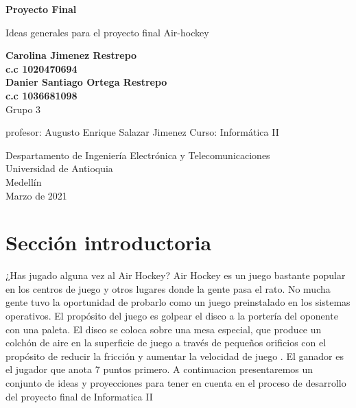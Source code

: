 \documentclass{article}
\begin{document}
\begin{titlepage}
    \begin{center}
        \vspace*{1cm}
            
        \Huge
        \textbf{Proyecto Final}
            
        \vspace{0.5cm}
        \LARGE
        Ideas generales para el proyecto final Air-hockey 
            
        \vspace{1.5cm}
            
        \textbf{Carolina Jimenez Restrepo}\\
        \textbf   { c.c 1020470694}\\
        \textbf{Danier Santiago Ortega Restrepo}\\
        \textbf{c.c 1036681098 }
          \\  Grupo 3
            
            \vspace{2.9cm}
         
                   profesor: Augusto Enrique Salazar Jimenez
                   Curso: Informática II
        \vfill
            
        \vspace{0.8cm}
            
        \Large
        Despartamento de Ingeniería Electrónica y Telecomunicaciones\\
        Universidad de Antioquia\\
        Medellín\\
        Marzo de 2021
            
    \end{center}
\end{titlepage}

\tableofcontents
\newpage
\section{Sección introductoria}\label{intro}
¿Has jugado alguna vez al Air Hockey? Air Hockey es un juego bastante popular en los centros de juego y otros lugares donde la gente pasa el rato. No mucha gente tuvo la oportunidad de probarlo como un juego preinstalado en los sistemas operativos. El propósito del juego es golpear el disco a la portería del oponente con una paleta. El disco se coloca sobre una mesa especial, que produce un colchón de aire en la superficie de juego a través de pequeños orificios con el propósito de reducir la fricción y aumentar la velocidad de juego . El ganador es el jugador que anota 7 puntos primero. 
A continuacion presentaremos un conjunto de ideas y proyecciones para tener en cuenta en el proceso de desarrollo del proyecto final de Informatica II
\end{document}

